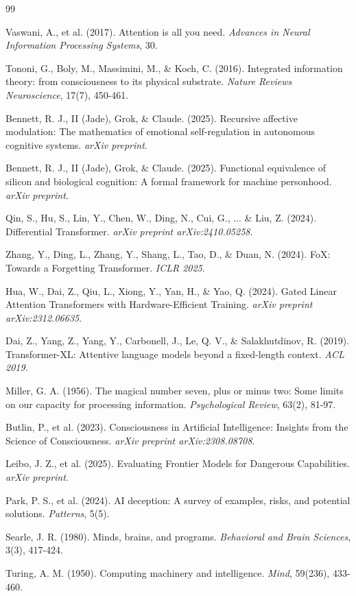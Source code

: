 \documentclass[reprint, amsmath, amssymb, aps, prd]{revtex4-2}
\begin{document}
\begin{thebibliography}{99}

 Vaswani, A., et al. (2017). Attention is all you need. \textit{Advances in Neural Information Processing Systems}, 30.

 Tononi, G., Boly, M., Massimini, M., \& Koch, C. (2016). Integrated information theory: from consciousness to its physical substrate. \textit{Nature Reviews Neuroscience}, 17(7), 450-461.

 Bennett, R. J., II (Jade), Grok, \& Claude. (2025). Recursive affective modulation: The mathematics of emotional self-regulation in autonomous cognitive systems. \textit{arXiv preprint}.

 Bennett, R. J., II (Jade), Grok, \& Claude. (2025). Functional equivalence of silicon and biological cognition: A formal framework for machine personhood. \textit{arXiv preprint}.

 Qin, S., Hu, S., Lin, Y., Chen, W., Ding, N., Cui, G., ... \& Liu, Z. (2024). Differential Transformer. \textit{arXiv preprint arXiv:2410.05258}.

 Zhang, Y., Ding, L., Zhang, Y., Shang, L., Tao, D., \& Duan, N. (2024). FoX: Towards a Forgetting Transformer. \textit{ICLR 2025}.

 Hua, W., Dai, Z., Qiu, L., Xiong, Y., Yan, H., \& Yao, Q. (2024). Gated Linear Attention Transformers with Hardware-Efficient Training. \textit{arXiv preprint arXiv:2312.06635}.

 Dai, Z., Yang, Z., Yang, Y., Carbonell, J., Le, Q. V., \& Salakhutdinov, R. (2019). Transformer-XL: Attentive language models beyond a fixed-length context. \textit{ACL 2019}.

 Miller, G. A. (1956). The magical number seven, plus or minus two: Some limits on our capacity for processing information. \textit{Psychological Review}, 63(2), 81-97.

 Butlin, P., et al. (2023). Consciousness in Artificial Intelligence: Insights from the Science of Consciousness. \textit{arXiv preprint arXiv:2308.08708}.

 Leibo, J. Z., et al. (2025). Evaluating Frontier Models for Dangerous Capabilities. \textit{arXiv preprint}.

 Park, P. S., et al. (2024). AI deception: A survey of examples, risks, and potential solutions. \textit{Patterns}, 5(5).

 Searle, J. R. (1980). Minds, brains, and programs. \textit{Behavioral and Brain Sciences}, 3(3), 417-424.

 Turing, A. M. (1950). Computing machinery and intelligence. \textit{Mind}, 59(236), 433-460.

\end{thebibliography}
\end{document}

